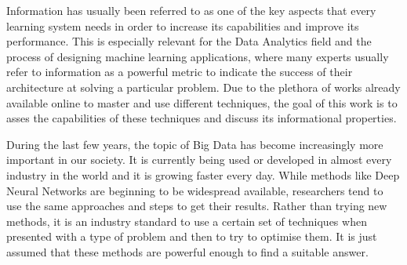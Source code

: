 \label{chap:Introduction}
Information has usually been referred to as one of the key aspects that every learning system needs in order to increase its capabilities and improve its performance. This is especially relevant for the Data Analytics field and the process of designing machine learning applications, where many experts usually refer to information as a powerful metric to indicate the success of their architecture at solving a particular problem. Due to the plethora of works already available online to master and use different techniques, the goal of this work is to asses the capabilities of these techniques and discuss its informational properties. 


During the last few years, the topic of Big Data has become increasingly more important in our society. It is currently being used or developed in almost every industry in the world \cite{article_Big_Data} and it is growing faster every day. While methods like Deep Neural Networks are beginning to be widespread available,  researchers tend to use the same approaches and steps to get their results. Rather than trying new methods, it is an industry standard to use a certain set of techniques when presented with a type of problem and then to try to optimise them. It is just assumed that these methods are powerful enough to find a suitable answer. 

